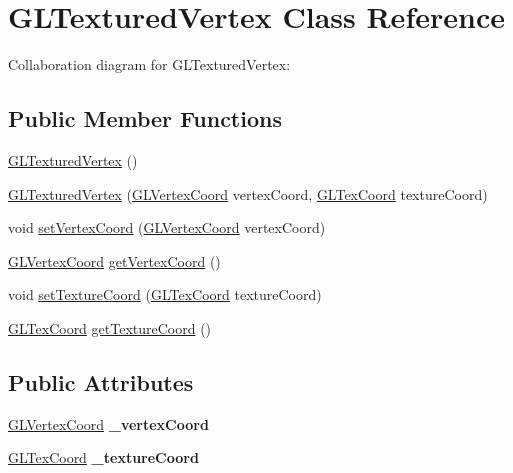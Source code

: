 \hypertarget{class_g_l_textured_vertex}{}\section{G\+L\+Textured\+Vertex Class Reference}
\label{class_g_l_textured_vertex}


Collaboration diagram for G\+L\+Textured\+Vertex\+:
\subsection*{Public Member Functions}
\begin{DoxyCompactItemize}
\item 
\hyperlink{class_g_l_textured_vertex_a198434cfb69c078e2714590204f678cb}{G\+L\+Textured\+Vertex} ()
\item 
\hyperlink{class_g_l_textured_vertex_a6f4cd460f9b8cad015669618b33917a9}{G\+L\+Textured\+Vertex} (\hyperlink{class_g_l_vertex_coord}{G\+L\+Vertex\+Coord} vertex\+Coord, \hyperlink{class_g_l_tex_coord}{G\+L\+Tex\+Coord} texture\+Coord)
\item 
void \hyperlink{class_g_l_textured_vertex_a5cb332aa21076e74f40cf482270fe2b7}{set\+Vertex\+Coord} (\hyperlink{class_g_l_vertex_coord}{G\+L\+Vertex\+Coord} vertex\+Coord)
\item 
\hyperlink{class_g_l_vertex_coord}{G\+L\+Vertex\+Coord} \hyperlink{class_g_l_textured_vertex_a2f1db1c4c296cda403eef672fbde0ebc}{get\+Vertex\+Coord} ()
\item 
void \hyperlink{class_g_l_textured_vertex_a945dc632704984b4419851a48e21f7f1}{set\+Texture\+Coord} (\hyperlink{class_g_l_tex_coord}{G\+L\+Tex\+Coord} texture\+Coord)
\item 
\hyperlink{class_g_l_tex_coord}{G\+L\+Tex\+Coord} \hyperlink{class_g_l_textured_vertex_a3023f227925dad4ecb597d243c386cab}{get\+Texture\+Coord} ()
\end{DoxyCompactItemize}
\subsection*{Public Attributes}
\begin{DoxyCompactItemize}
\item 
\hypertarget{class_g_l_textured_vertex_a50f07581c64941b44ec3e23fb584b06f}{}\hyperlink{class_g_l_vertex_coord}{G\+L\+Vertex\+Coord} {\bfseries \+\_\+vertex\+Coord}\label{class_g_l_textured_vertex_a50f07581c64941b44ec3e23fb584b06f}

\item 
\hypertarget{class_g_l_textured_vertex_a5d76e154e279e70e44bca2ec36b02dae}{}\hyperlink{class_g_l_tex_coord}{G\+L\+Tex\+Coord} {\bfseries \+\_\+texture\+Coord}\label{class_g_l_textured_vertex_a5d76e154e279e70e44bca2ec36b02dae}

\end{DoxyCompactItemize}


